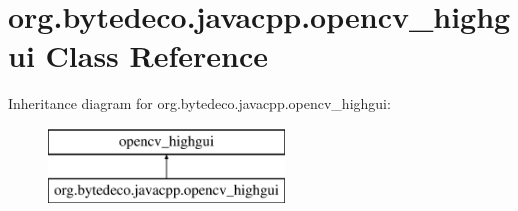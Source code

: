 \hypertarget{classorg_1_1bytedeco_1_1javacpp_1_1opencv__highgui}{}\section{org.\+bytedeco.\+javacpp.\+opencv\+\_\+highgui Class Reference}
\label{classorg_1_1bytedeco_1_1javacpp_1_1opencv__highgui}
Inheritance diagram for org.\+bytedeco.\+javacpp.\+opencv\+\_\+highgui\+:\begin{figure}[H]
\begin{center}
\leavevmode
\includegraphics[height=2.000000cm]{classorg_1_1bytedeco_1_1javacpp_1_1opencv__highgui}
\end{center}
\end{figure}
